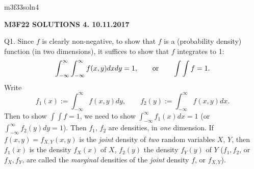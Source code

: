 \documentclass[12pt]{article}
\begin{document}
\def\R{\mathbb{R}}
\def\C{\mathbb{C}}
\def\Z{\mathbb{Z}}
\def\N{\mathbb{N}}
\def\Q{\mathbb{Q}}
\def\D{\mathbb{D}}
\def\Sp{{\mathbb{S}}}
\def\T{\mathbb{T}}
\def\H{\mathbb{H}}
\def\hb{\hfil \break}
\def\ni{\noindent}
\def\i{\indent}
\def\a{\alpha}
\def\b{\beta}
\def\e{\epsilon}
\def\d{\delta}
\def\D{\Delta}
\def\G{\Gamma}
\def\g{\gamma}
\def\l{\lambda}
\def\m{\mu}
\def\s{\sigma}
\def\Si{\Sigma}
\def\th{\theta}
\def\z{\zeta}
\def\p{\partial}
\def\o{\omega}
\def\O{\Omega}
\def\t{\tau}
\def\L{\it \char'44}
\def\F{\mathcal{F}}
\def\B{\mathcal{B}}
\def\C{\mathcal{C}}
\def\half{\frac{1}{2}}
\ni m3f33soln4 \\
\begin{center}
{\bf M3F22 SOLUTIONS 4.  10.11.2017} 
\end{center}

\ni Q1.  Since $f$ is clearly non-negative, to show that $f$ is a (probability
density) function (in two dimensions), it suffices to show that
$f$ integrates to 1:
\[
\int_{-\infty}^{\infty} \int_{-\infty}^{\infty} f(x,y) dx dy = 1,
\qquad \hbox{or} \qquad \int \int f = 1.
\]
Write
\[
f_1(x) := \int_{-\infty}^{\infty} f(x,y) dy, \qquad f_2(y) :=
\int_{-\infty}^{\infty} f(x,y) dx.
\]
Then to show $\int \int f = 1$, we need to show
$\int_{-\infty}^{\infty} f_1(x) dx = 1$ (or
$\int_{-\infty}^{\infty}f_2(y) dy = 1$).  Then $f_1$, $f_2$ are
densities, in {\it one} dimension. If $f(x,y) = f_{X,Y}(x,y)$ is
the {\it joint} density of {\it two} random variables $X$, $Y$,
then $f_1(x)$ is the density $f_X(x)$ of $X$, $f_2(y)$ the density
$f_Y(y)$ of $Y$ ($f_1, f_2$, or $f_X, f_Y$, are called the {\it
marginal} densities of the {\it joint}
density $f$, or $f_{X,Y}$).
\end{document}
